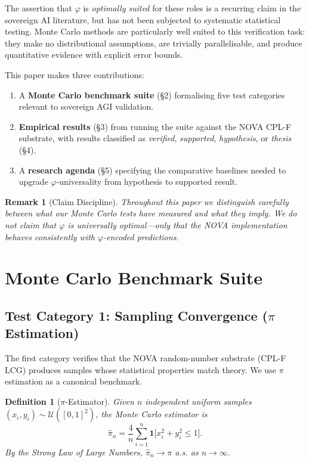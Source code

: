 \documentclass[11pt,a4paper]{article}
\newtheorem{definition}{Definition}
\newtheorem{remark}{Remark}
\begin{document}
The assertion that $\varphi$ is \emph{optimally suited} for these roles is a recurring
claim in the sovereign AI literature, but has not been subjected to systematic
statistical testing.  Monte Carlo methods are particularly well suited to this
verification task: they make no distributional assumptions, are trivially parallelisable,
and produce quantitative evidence with explicit error bounds.

This paper makes three contributions:
\begin{enumerate}
  \item A \textbf{Monte Carlo benchmark suite} (§2) formalising five test categories
    relevant to sovereign AGI validation.
  \item \textbf{Empirical results} (§3) from running the suite against the NOVA CPL-F
    substrate, with results classified as \emph{verified}, \emph{supported},
    \emph{hypothesis}, or \emph{thesis} (§4).
  \item A \textbf{research agenda} (§5) specifying the comparative baselines needed to
    upgrade $\varphi$-universality from hypothesis to supported result.
\end{enumerate}

\begin{remark}[Claim Discipline]
Throughout this paper we distinguish carefully between what our Monte Carlo tests
\emph{have} measured and what they \emph{imply}.  We do not claim that $\varphi$ is
universally optimal—only that the NOVA implementation behaves consistently with
$\varphi$-encoded predictions.
\end{remark}

\section{Monte Carlo Benchmark Suite}
\label{sec:suite}

\subsection{Test Category 1: Sampling Convergence ($\pi$ Estimation)}

The first category verifies that the NOVA random-number substrate (CPL-F LCG)
produces samples whose statistical properties match theory.  We use $\pi$ estimation
as a canonical benchmark.

\begin{definition}[$\pi$-Estimator]
Given $n$ independent uniform samples $(x_i, y_i) \sim \mathcal{U}([0,1]^2)$, the
Monte Carlo estimator is
\[
  \hat{\pi}_n = \frac{4}{n} \sum_{i=1}^{n} \mathbf{1}\bigl[x_i^2 + y_i^2 \le 1\bigr].
\]
By the Strong Law of Large Numbers, $\hat{\pi}_n \to \pi$ a.s. as $n \to \infty$.
\end{definition}
\end{document}
